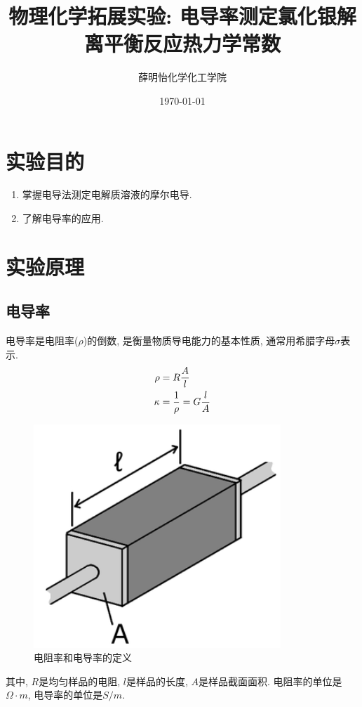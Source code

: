 \documentclass[a4paper]{article}
\title{物理化学拓展实验: 电导率测定氯化银解离平衡反应热力学常数}
\author{薛明怡\quad 151250177\quad 化学化工学院}
\date{\today}
\begin{document}
\maketitle
\section{实验目的}
\begin{enumerate}
	\item 掌握电导法测定电解质溶液的摩尔电导.
	\item 了解电导率的应用.
\end{enumerate}
\section{实验原理}
\subsection{电导率}
电导率是电阻率($\rho$)的倒数, 是衡量物质导电能力的基本性质, 通常用希腊字母$\sigma$表示.
\begin{equation}
	\centering
	\begin{aligned}
		\rho &= R\frac{A}{l}\\
		\kappa &= \frac{1}{\rho}= G\frac{l}{A}\\
	\end{aligned}
\end{equation}
\begin{figure}[H]
	\centering
	\includegraphics[width=0.2\paperwidth]{fig/resistivity_conductivity_definition.PNG}
	\caption{电阻率和电导率的定义}
\end{figure}
其中, $R$是均匀样品的电阻, $l$是样品的长度, $A$是样品截面面积.
电阻率的单位是$\Omega\cdot m$, 电导率的单位是$S/m$.
\end{document}

